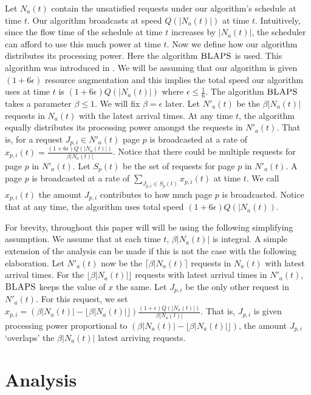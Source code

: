 \documentclass[11pt]{article}
\newcommand{\eps}{\epsilon}
\newcommand{\floor}[1]{\lfloor #1 \rfloor}
\newcommand{\ceil}[1]{\lceil #1 \rceil}
\newcommand{\blaps}{\textrm{\sc BLAPS}}
\begin{document}
Let $N_a(t)$ contain the unsatisfied requests under our algorithm's schedule at time $t$.  Our algorithm broadcasts at speed $Q(|N_a(t)|)$ at time $t$.   Intuitively, since the flow time of the schedule at time $t$ increases by $|N_a(t)|$, the scheduler can afford to use this much power at time $t$.   Now we define how our algorithm distributes its processing power.  Here the algorithm $\blaps$ is used.  This algorithm was introduced in \cite{EdmondsP09,BansalKN09}.    We will be assuming that our algorithm is given $(1+ 6\eps)$ resource augmentation and this implies the total speed our algorithm uses at time $t$ is $(1+ 6\eps)Q(|N_a(t)|)$ where $\eps \leq \frac{1}{6}$.  The algorithm $\blaps$  takes a parameter $\beta \leq 1$.  We will fix $\beta = \eps$ later.  Let $N'_a(t)$ be the $\beta|N_a(t)|$ requests in $N_a(t)$ with the latest arrival times. At any time $t$, the algorithm equally distributes its processing power amongst the requests in $N'_a(t)$.  That is, for a request $J_{p,i} \in N'_a(t)$ page $p$ is broadcasted at a rate of $x_{p,i}(t) = \frac{(1+6\eps)Q(|N_a(t)|)}{\beta|N_a(t)|}$. Notice that there could be multiple requests for page $p$ in $N'_a(t)$. Let $S_p(t)$ be the set of requests for page $p$ in $N'_a(t)$. A page $p$ is broadcasted at a rate of $\sum_{J_{p,i} \in S_p(t)} x_{p,i}(t)$ at time $t$.  We call $x_{p,i}(t)$ the amount $J_{p,i}$ contributes to how much page $p$ is broadcasted.  Notice that at any time, the algorithm uses total speed $(1+6\eps)Q(|N_a(t))$.

For brevity, throughout this paper will will be using the following simplifying assumption.   We assume that at each time $t$, $\beta|N_a(t)|$ is integral.  A simple extension of the analysis can be made if this is not the case with the following elaboration.   Let $N'_a(t)$ now be the $\ceil{\beta|N_a(t)}$ requests in $N_a(t)$ with latest arrival times. For the $\floor{\beta|N_a(t)|}$ requests with latest arrival times in $N'_a(t)$, $\blaps$ keeps the value of $x$ the same.  Let $J_{p,i}$ be the only other request in $N'_a(t)$. For this request, we set $x_{p,i} =  (\beta|N_a(t)| - \floor{\beta|N_a(t)|})\frac{(1+\eps)Q(|N_a(t)|)}{\beta|N_a(t)|}$.  That is, $J_{p,i}$ is given processing power proportional to $(\beta|N_a(t)| - \floor{\beta|N_a(t)|})$, the amount $J_{p,i}$ `overlaps' the $\beta|N_a(t)|$ latest arriving requests.




\section{Analysis}
\end{document}
